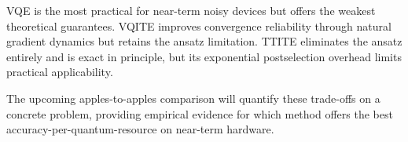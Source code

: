 \documentclass[11pt,a4paper]{article}
\begin{document}
VQE is the most practical for near-term noisy devices but offers the weakest
theoretical guarantees.  VQITE improves convergence reliability through
natural gradient dynamics but retains the ansatz limitation.  TTITE
eliminates the ansatz entirely and is exact in principle, but its
exponential postselection overhead limits practical applicability.

The upcoming apples-to-apples comparison will quantify these trade-offs on
a concrete problem, providing empirical evidence for which method offers the
best accuracy-per-quantum-resource on near-term hardware.
\end{document}
